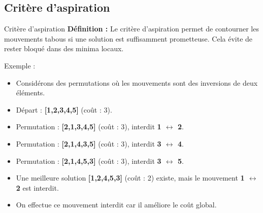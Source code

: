 \documentclass{beamer}
\begin{document}
\subsection{Critère d'aspiration}
\begin{frame}{Critère d'aspiration}
    \textbf{Définition :} 
    Le critère d'aspiration permet de contourner les mouvements tabous si une solution est suffisamment prometteuse. Cela évite de rester bloqué dans des minima locaux.

    \begin{exampleblock}{Exemple :}
        \begin{itemize}
            \item Considérons des permutations où les mouvements sont des inversions de deux
                  éléments.
            \item Départ : \textbf{[1,2,3,4,5]} (coût : 3).
            \item Permutation : \textbf{[2,1,3,4,5]} (coût : 3), interdit \textbf{1
                      $\leftrightarrow$ 2}.
            \item Permutation : \textbf{[2,1,4,3,5]} (coût : 3), interdit \textbf{3
                      $\leftrightarrow$ 4}.
            \item Permutation : \textbf{[2,1,4,5,3]} (coût : 3), interdit \textbf{3
                      $\leftrightarrow$ 5}.
            \item Une meilleure solution \textbf{[1,2,4,5,3]} (coût : 2) existe, mais le
                  mouvement \textbf{1 $\leftrightarrow$ 2} est interdit.
            \item On effectue ce mouvement interdit car il améliore le coût global.
        \end{itemize}
    \end{exampleblock}
\end{frame}
\end{document}
